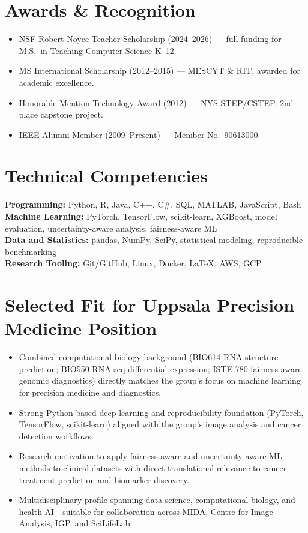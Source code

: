 \documentclass[11pt]{article}
\begin{document}
\section{Awards \& Recognition}
\begin{itemize}
  \item NSF Robert Noyce Teacher Scholarship (2024--2026) --- full funding for M.S.\ in Teaching Computer Science K--12.
  \item MS International Scholarship (2012--2015) --- MESCYT \& RIT, awarded for academic excellence.
  \item Honorable Mention Technology Award (2012) --- NYS STEP/CSTEP, 2nd place capstone project.
  \item IEEE Alumni Member (2009--Present) --- Member No.\ 90613000.
\end{itemize}

\section{Technical Competencies}
\textbf{Programming:} Python, R, Java, C++, C\#, SQL, MATLAB, JavaScript, Bash\\
\textbf{Machine Learning:} PyTorch, TensorFlow, scikit-learn, XGBoost, model evaluation, uncertainty-aware analysis, fairness-aware ML\\
\textbf{Data and Statistics:} pandas, NumPy, SciPy, statistical modeling, reproducible benchmarking\\
\textbf{Research Tooling:} Git/GitHub, Linux, Docker, LaTeX, AWS, GCP

\section{Selected Fit for Uppsala Precision Medicine Position}
\begin{itemize}
  \item Combined computational biology background (BIO614 RNA structure prediction; BIO550 RNA-seq differential expression; ISTE-780 fairness-aware genomic diagnostics) directly matches the group's focus on machine learning for precision medicine and diagnostics.
  \item Strong Python-based deep learning and reproducibility foundation (PyTorch, TensorFlow, scikit-learn) aligned with the group's image analysis and cancer detection workflows.
  \item Research motivation to apply fairness-aware and uncertainty-aware ML methods to clinical datasets with direct translational relevance to cancer treatment prediction and biomarker discovery.
  \item Multidisciplinary profile spanning data science, computational biology, and health AI---suitable for collaboration across MIDA, Centre for Image Analysis, IGP, and SciLifeLab.
\end{itemize}
\end{document}
